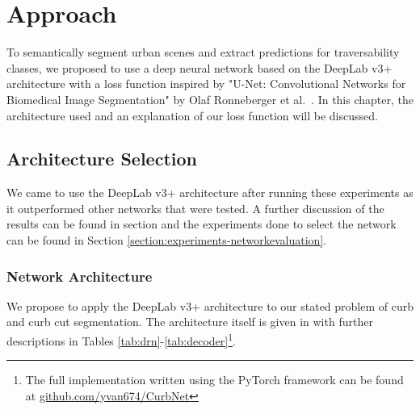 \chapter{Approach}\label{chap:approach}
To semantically segment urban scenes and extract predictions for traversability classes, we proposed to use a deep neural network based on the DeepLab v3+ architecture with a loss function inspired by "U-Net: Convolutional Networks for Biomedical Image Segmentation" by Olaf Ronneberger et al.~\cite{unet}.
In this chapter, the architecture used and an explanation of our loss function will be discussed.

\section{Architecture Selection} \label{section:approach-architectureselection}
We came to use the DeepLab v3+ architecture after running these experiments as it outperformed other networks that were tested.
A further discussion of the results can be found in section and the experiments done to select the network can be found in Section \ref{section:experiments-networkevaluation}.

\subsection{Network Architecture}\label{section:approach-networkarchitecture}
We propose to apply the DeepLab v3+ architecture to our stated problem of curb and curb cut segmentation.
The architecture itself is given in  with further descriptions in Tables \ref{tab:drn}-\ref{tab:decoder}\footnote{The full implementation written using the PyTorch framework can be found at \url{github.com/yvan674/CurbNet}}.







